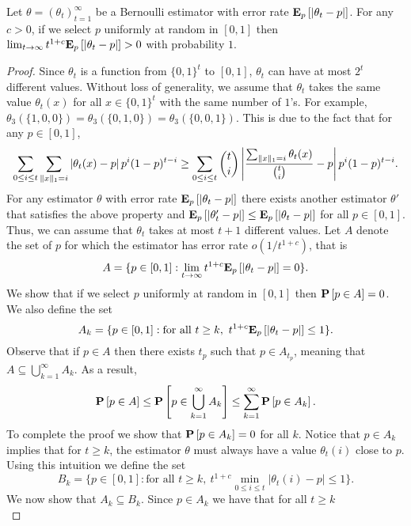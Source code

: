 \begin{lemma}\label{l:estimation_lower_bound}
  Let $\theta=(\theta_t)_{t=1}^\infty$ be a Bernoulli estimator
  with error rate $\Expnew{p}{|\theta_t  - p |}$.
  For any $c>0$, if we select $p$ uniformly at random in $[0,1]$ then
   \(\lim_{t\to \infty} t^{1+c} \Expnew{p}{|\theta_t  - p |} > 0\) with
   probability $1$.
\end{lemma}
\begin{proof}
Since $\theta_t$ is a function from $\{0,1\}^t$ to $[0,1]$, $\theta_t$ can have at most
  $2^t$ different values. Without loss of generality, we assume that
  $\theta_t$ takes the same value $\theta_t(x)$ for all $x \in \{0,1\}^t$
  with the same number of $1$'s. For example,
  $\theta_3(\{1,0,0\})=\theta_3(\{0,1,0\})=\theta_3(\{0,0,1\})$.
  This is due to the fact that for any $p \in[0,1]$,
  \[
    \sum_{0 \leq i \leq t} \sum_{\norm{1}{x} = i} \lp| \theta_t(x) - p \rp|
    p^i (1-p)^{t-i} \geq \sum_{0 \leq i \leq t} \binom{t}{i} \lp|
    \frac{\sum_{\norm{1}{x} = i} \theta_t(x)}{\binom{t}{i}}  - p \rp| p^i
    (1-p)^{t-i}.
  \]
  For any estimator $\theta$ with error rate $\Expnew{p}{|\theta_t  - p |}$ there exists another
  estimator $\theta'$ that satisfies the above property and
  $\Expnew{p}{|\theta_t'  - p |} \leq \Expnew{p}{|\theta_t  - p |}$ for all $p \in [0,1]$.
  Thus, we can assume that $\theta_t$ takes at most $t+1$ different
  values.
  Let $A$ denote the set of $p$ for which the estimator has error
  rate $o(1/t^{1+c})$, that is
  \[
    A= \{p\in [0,1]: \lim_{t \to \infty} t^{1+c}\Expnew{p}{|\theta_t  - p |}=0\}.
  \]
  We show that if we select $p$ uniformly at random in $[0,1]$ then
  $\Prob{p \in A} = 0$.  We also define the set
  \[
    A_k=\{p\in [0,1]: \text{for all }t \geq k,~
    t^{1+c}\Expnew{p}{|\theta_t  - p |}\leq 1\}.
  \]
  Observe that if $p \in A$ then there exists $t_p$ such that
  $p \in A_{t_p}$, meaning that
  $A \subseteq \bigcup_{k=1}^{\infty}A_k$.  As a result,
  \[
    \Prob{p \in A} \leq \Prob {p \in\bigcup_{k=1}^{\infty}A_k} \leq
    \sum_{k=1}^{\infty}\Prob{p \in A_k}.
  \]
  To complete the proof we show that $\Prob{p \in A_k}=0$ for all $k$.
  Notice that $p \in A_k$ implies that for $t \geq k$, the estimator
  $\theta$ must always have a value $\theta_t(i)$ close to $p$.
  Using this intuition we define the set
  \[
    B_k = \{p \in [0,1]: \text{for all
    }t\geq k,~ t^{1+c}\min_{0\leq i \leq t}|\theta_t(i)-p| \leq 1\}.
  \]
  We now show that $A_k \subseteq B_k$.
  Since $p \in A_k$ we have that for all $t\geq k$
  \[
\]
\end{proof}
